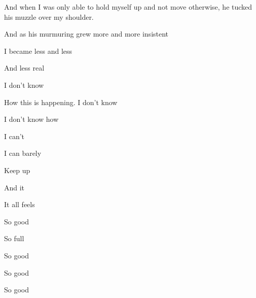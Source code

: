 \documentclass[12pt,letterpaper,oneside]{memoir}
\begin{document}
  And when I was only able to hold myself up and not move otherwise, he tucked his muzzle over my shoulder.

  And as his murmuring grew more and more insistent

  I became less and less

  And less real

  I don't know

  How this is happening. I don't know

  I don't know how

  I can't

  I can barely

  Keep up

  And it

  It all feels

  So good

  So full

  So good

  So good

  So good
\end{document}
